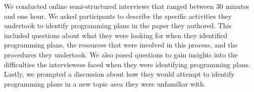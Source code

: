 We conducted online semi-structured interviews that ranged between 30 minutes and one hour. 
We asked participants to describe the specific activities they undertook to identify programming plans in the paper they authored. This included questions about what they were looking for when they identified programming plans, the resources that were involved in this process, and the procedures they undertook.
We also posed questions to gain insights into the difficulties the interviewees faced when they were identifying programming plans.
Lastly, we prompted a discussion about how they would attempt to identify programming plans in a new topic area they were unfamiliar with.





